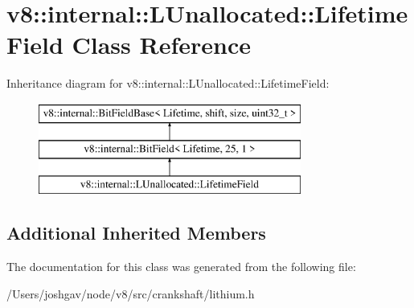 \hypertarget{classv8_1_1internal_1_1_l_unallocated_1_1_lifetime_field}{}\section{v8\+:\+:internal\+:\+:L\+Unallocated\+:\+:Lifetime\+Field Class Reference}
\label{classv8_1_1internal_1_1_l_unallocated_1_1_lifetime_field}
Inheritance diagram for v8\+:\+:internal\+:\+:L\+Unallocated\+:\+:Lifetime\+Field\+:\begin{figure}[H]
\begin{center}
\leavevmode
\includegraphics[height=3.000000cm]{classv8_1_1internal_1_1_l_unallocated_1_1_lifetime_field}
\end{center}
\end{figure}
\subsection*{Additional Inherited Members}


The documentation for this class was generated from the following file\+:\begin{DoxyCompactItemize}
\item 
/\+Users/joshgav/node/v8/src/crankshaft/lithium.\+h\end{DoxyCompactItemize}
